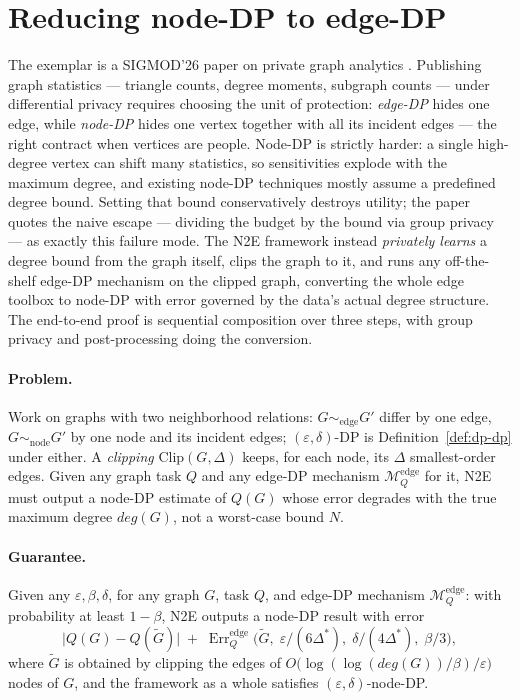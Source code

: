 \section{Reducing node-DP to edge-DP}
\label{sec:dp-337}

The exemplar is a SIGMOD'26 paper on private graph analytics \citep{sigmod26-337}.
Publishing graph statistics --- triangle counts, degree moments, subgraph counts ---
under differential privacy requires choosing the unit of protection: \emph{edge-DP}
hides one edge, while \emph{node-DP} hides one vertex together with all its incident
edges --- the right contract when vertices are people. Node-DP is strictly harder: a
single high-degree vertex can shift many statistics, so sensitivities explode with the
maximum degree, and existing node-DP techniques mostly assume a predefined degree
bound. Setting that bound conservatively destroys utility; the paper quotes the naive
escape --- dividing the budget by the bound via group privacy --- as exactly this
failure mode. The N2E framework instead \emph{privately learns} a degree bound from the
graph itself, clips the graph to it, and runs any off-the-shelf edge-DP mechanism on the
clipped graph, converting the whole edge toolbox to node-DP with error governed by the
data's actual degree structure. The end-to-end proof is sequential composition over
three steps, with group privacy and post-processing doing the conversion.

\paragraph{Problem.}
Work on graphs with two neighborhood relations: $G \sim_{\mathrm{edge}} G'$ differ by
one edge, $G \sim_{\mathrm{node}} G'$ by one node and its incident edges;
$(\varepsilon,\delta)$-DP is Definition~\ref{def:dp-dp} under either. A
\emph{clipping} $\mathrm{Clip}(G,\Delta)$ keeps, for each node, its $\Delta$
smallest-order edges. Given any graph task $Q$ and any edge-DP mechanism
$\mathcal{M}^{\mathrm{edge}}_Q$ for it, N2E must output a node-DP estimate of $Q(G)$
whose error degrades with the true maximum degree $\mathit{deg}(G)$, not a worst-case
bound $N$.

\paragraph{Guarantee.}

\begin{theorem}
\label{thm:dp-337-main}
Given any $\varepsilon, \beta, \delta$, for any graph $G$, task $Q$, and edge-DP
mechanism $\mathcal{M}^{\mathrm{edge}}_Q$: with probability at least $1-\beta$, N2E
outputs a node-DP result with error
\[
\bigl|Q(G) - Q(\tilde G)\bigr| \;+\;
\operatorname{Err}^{\mathrm{edge}}_Q\bigl(\tilde G,\;
\varepsilon/(6\Delta^*),\; \delta/(4\Delta^*),\; \beta/3\bigr),
\]
where $\tilde G$ is obtained by clipping the edges of
$O\bigl(\log(\log(\mathit{deg}(G))/\beta)/\varepsilon\bigr)$ nodes of $G$, and the
framework as a whole satisfies $(\varepsilon,\delta)$-node-DP. \eop
\end{theorem}

